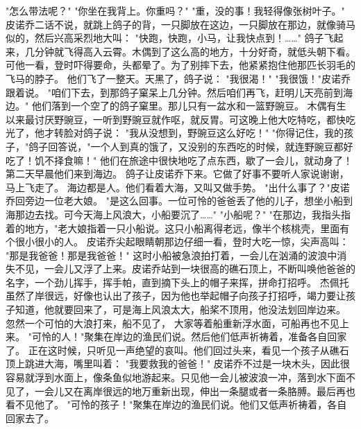 \documentclass[12pt,UTF8]{ctexbook}
\begin{document}
"怎么带法呢？"
"你坐在我背上。你重吗？"
"重，没的事！我轻得像张树叶子。"
皮诺乔二话不说，就跳上鸽子的背，一只脚放在这边，一只脚放在那边，就像骑马似的，然后兴高采烈地大叫：
"快跑，快跑，小马，让我快点到！……"
鸽子飞起来，几分钟就飞得高入云霄。木偶到了这么高的地方，十分好奇，就低头朝下看。可他一看，登时吓得要命，头都晕了。为了别摔下去，他紧紧抱住他那匹长羽毛的飞马的脖子。
他们飞了一整天。天黑了，鸽子说：
"我很渴！"
"我很饿！"皮诺乔跟着说。
"咱们下去，到那鸽子窠呆上几分钟。然后咱们再飞，赶明儿天亮前到海边。"
他们落到一个空了的鸽子窠里。那儿只有一盆水和一篮野豌豆。
木偶有生以来最讨厌野豌豆，一听到野豌豆就作呕，就反胃。可这晚上他大吃特吃，都快吃光了，他才转脸对鸽子说：
"我从没想到，野豌豆这么好吃！"
"你得记住，我的孩子，"鸽子回答说，"一个人到真的饿了，又没别的东西吃的时候，就连野豌豆都好吃了！饥不择食嘛！"
他们在旅途中很快地吃了点东西，歇了一会儿，就动身了！第二天早晨他们来到海边。
鸽子让皮诺乔下来。它做了好事不要听人家说谢谢，马上飞走了。
海边都是人。他们看着大海，又叫又做手势。
"出什么事了？"皮诺乔回旁边一位老大娘。
"是这么回事。一位可怜的爸爸丢了他的儿子，想坐小船到海那边去找。可今天海上风浪大，小船要沉了……"
"小船呢？"
"在那边，我指头指着的地方，"老大娘指着一只小船说。这只小船离得老远，像半个核桃壳，里面有个很小很小的人。
皮诺乔尖起眼睛朝那边仔细一看，登时大吃一惊，尖声高叫：
"那是我爸爸！那是我爸爸！"
这时小船被急浪拍打着，一会儿在汹涌的波浪中消失不见，一会儿又浮了上来。皮诺乔站到一块很高的礁石顶上，不断叫唤他爸爸的名字，一个劲儿挥手，挥手帕，直到摘下头上的帽子来挥，拼命打招呼。
杰佩托虽然了岸很远，好像也认出了孩子，因为他也举起帽子向孩子打招呼，竭力要让孩子知道，他就要回来了，可是海上风浪太大，船桨不顶用，他没法划回岸边来。
忽然一个可怕的大浪打来，船不见了，
大家等着船重新浮水面，可船再也不见上来。
"可怜的人！"聚集在岸边的渔民们说。然后他们低声祈祷着，准备各自回家了。
正在这时候，只听见一声绝望的哀叫。他们回过头来，看见一个孩子从礁石顶上跳进大海，嘴里叫着：
"我要救我的爸爸！"
皮诺乔不过是一块木头，因此很容易就浮到水面上，像条鱼似地游起来。只见他一会儿被波浪一冲，落到水下面不见了，一会儿又在离岸很远的地万重新出现，伸出一条腿或者一条胳膊。最后再也看不见他了。
"可怜的孩子！"聚集在岸边的渔民们说。他们又低声祈祷着，各自回家去了。

\chapter{}
\end{document}
